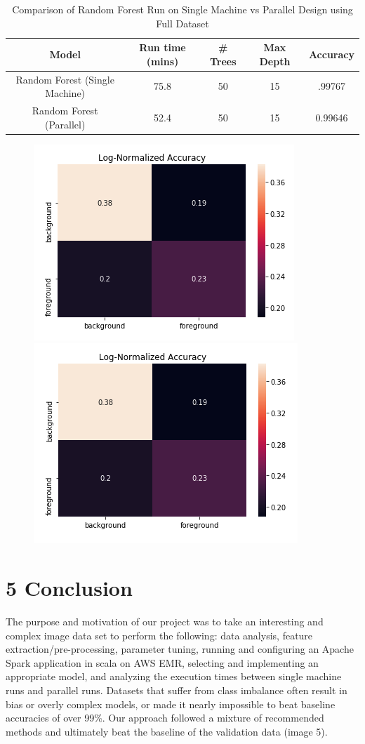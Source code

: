 \documentclass{neu_handout}
\begin{document}
\begin{table}[h!]
\centering
 \begin{tabular}{||c c c c c||} 
 \hline
Model & Run time (mins) & \# Trees & Max Depth & Accuracy \\ [0.5ex] 
 \hline\hline
Random Forest (Single Machine) & 75.8  & 50 & 15 & .99767   \\[1ex] 
 \hline
 Random Forest (Parallel) & 52.4  & 50 & 15 & 0.99646 \\
\hline
 \end{tabular}
 \caption{Comparison of Random Forest Run on Single Machine vs Parallel Design using Full Dataset}
 \label{tab:accuracy-comparison}
\end{table}


\begin{figure}[h]
\centering
{
\includegraphics[width=0.4\linewidth]{rflocalgini}
\label{fig:rflocalgini}
}
{
\includegraphics[width=0.4\linewidth]{rflocalentropy}
\label{fig:rflocalentropy}
}
\end{figure}



\section*{5 Conclusion}
The purpose and motivation of our project was to take an interesting and complex image data set to perform the following: data analysis, feature extraction/pre-processing, parameter tuning, running and configuring an Apache Spark application in scala on AWS EMR, selecting and implementing an appropriate model, and analyzing the execution times between single machine runs and parallel runs. Datasets that suffer from class imbalance often result in bias or overly complex models, or made it nearly impossible to beat baseline accuracies of over 99\%. Our approach followed a mixture of recommended methods and ultimately beat the baseline of the validation data (image 5).\\
\end{document}
